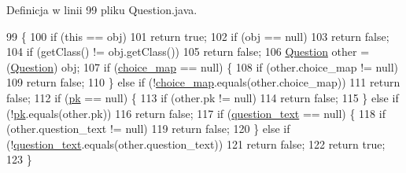 Definicja w linii 99 pliku Question.\+java.


\begin{DoxyCode}
99                                       \{
100         \textcolor{keywordflow}{if} (\textcolor{keyword}{this} == obj)
101             \textcolor{keywordflow}{return} \textcolor{keyword}{true};
102         \textcolor{keywordflow}{if} (obj == null)
103             \textcolor{keywordflow}{return} \textcolor{keyword}{false};
104         \textcolor{keywordflow}{if} (getClass() != obj.getClass())
105             \textcolor{keywordflow}{return} \textcolor{keyword}{false};
106         \hyperlink{classcom_1_1example_1_1qrpoll_1_1_question_aeeae84aca53cbbce8820daf91436564c}{Question} other = (\hyperlink{classcom_1_1example_1_1qrpoll_1_1_question_aeeae84aca53cbbce8820daf91436564c}{Question}) obj;
107         \textcolor{keywordflow}{if} (\hyperlink{classcom_1_1example_1_1qrpoll_1_1_question_aa382153815db46e065ab637ef86f9265}{choice\_map} == null) \{
108             \textcolor{keywordflow}{if} (other.choice\_map != null)
109                 \textcolor{keywordflow}{return} \textcolor{keyword}{false};
110         \} \textcolor{keywordflow}{else} \textcolor{keywordflow}{if} (!\hyperlink{classcom_1_1example_1_1qrpoll_1_1_question_aa382153815db46e065ab637ef86f9265}{choice\_map}.equals(other.choice\_map))
111             \textcolor{keywordflow}{return} \textcolor{keyword}{false};
112         \textcolor{keywordflow}{if} (\hyperlink{classcom_1_1example_1_1qrpoll_1_1_question_ab94e31e243d24239faf4ae4c68c28f0b}{pk} == null) \{
113             \textcolor{keywordflow}{if} (other.pk != null)
114                 \textcolor{keywordflow}{return} \textcolor{keyword}{false};
115         \} \textcolor{keywordflow}{else} \textcolor{keywordflow}{if} (!\hyperlink{classcom_1_1example_1_1qrpoll_1_1_question_ab94e31e243d24239faf4ae4c68c28f0b}{pk}.equals(other.pk))
116             \textcolor{keywordflow}{return} \textcolor{keyword}{false};
117         \textcolor{keywordflow}{if} (\hyperlink{classcom_1_1example_1_1qrpoll_1_1_question_ab90d61211a23303be8fe8139aed31754}{question\_text} == null) \{
118             \textcolor{keywordflow}{if} (other.question\_text != null)
119                 \textcolor{keywordflow}{return} \textcolor{keyword}{false};
120         \} \textcolor{keywordflow}{else} \textcolor{keywordflow}{if} (!\hyperlink{classcom_1_1example_1_1qrpoll_1_1_question_ab90d61211a23303be8fe8139aed31754}{question\_text}.equals(other.question\_text))
121             \textcolor{keywordflow}{return} \textcolor{keyword}{false};
122         \textcolor{keywordflow}{return} \textcolor{keyword}{true};
123     \}
\end{DoxyCode}
